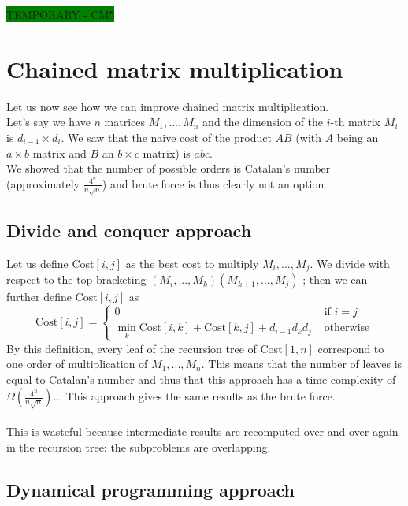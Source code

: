 \colorbox{green}{TEMPORARY - CM5}


\section{Chained matrix multiplication}

Let us now see how we can improve chained matrix multiplication.\\
Let's say we have $n$ matrices $M_1,..., M_n$ and the dimension of the $i$-th matrix $M_i$ is $d_{i-1} \times d_i$. We saw that the naive cost of the product $AB$ (with $A$ being an $a \times b$ matrix and $B$ an $b \times c$ matrix) is $abc$.\\ 

We showed that the number of possible orders is Catalan's number (approximately $\frac{4^n}{n\sqrt{n}}$) and brute force is thus clearly not an option.


\subsection{Divide and conquer approach} 

Let us define Cost$[i,j]$ as the best cost to multiply $M_i,...,M_j$. We divide with respect to the top bracketing $(M_i,...,M_k)(M_{k+1},...,M_j)$ ; then we can further define Cost$[i,j]$ as 
\begin{equation}
 \text{Cost}[i,j] = \begin{cases} 
 	0 & \text{ if } i=j \\
 	\min_k \text{Cost}[i,k] + \text{Cost}[k,j] + d_{i-1}d_kd_j & \text{ otherwise}
 \end{cases}
 \label{eq1}
\end{equation}
By this definition, every leaf of the recursion tree of Cost$[1,n]$ correspond to one order of multiplication of $M_1,...,M_n$. This means that the number of leaves is equal to Catalan's number and thus that this approach has a time complexity of $\Omega  (\frac{4^n}{n\sqrt{n}})$... This approach gives the same results as the brute force. 
\\ \\
This is wasteful because intermediate results are recomputed over and over again in the recursion tree: the subproblems are overlapping.

\subsection{Dynamical programming approach}

